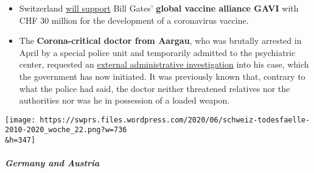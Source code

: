 \begin{itemize}
{  900,000 US dollars} to the Swiss Agency for Therapeutic Products
  \textbf{Swissmedic} for ``projects in Africa''.
\item
  Switzerland
  \href{https://www.aargauerzeitung.ch/panorama/schweiz-unterstuetzt-impfallianz-gavi-mit-30-millionen-138082583}{will
  support} Bill Gates' \textbf{global vaccine alliance GAVI} with CHF 30
  million for the development of a coronavirus vaccine.
\item
  The \textbf{Corona-critical doctor from Aargau}, who was brutally
  arrested in April by a special police unit and temporarily admitted to
  the psychiatric center, requested an
  \href{https://www.aargauerzeitung.ch/aargau/kanton-aargau/polizeieinsatz-wegen-wettinger-arzt-regierung-beschliesst-externe-administrativuntersuchung-137913013}{external
  administrative investigation} into his case, which the government has
  now initiated. It was previously known that, contrary to what the
  police had said, the doctor neither threatened relatives nor the
  authorities nor was he in possession of a loaded weapon.
\end{itemize}

\texttt{[image: https://swprs.files.wordpress.com/2020/06/schweiz-todesfaelle-2010-2020\_woche\_22.png?w=736\\\&h=347]}

\hypertarget{germany-and-austria}{%
\subparagraph{\texorpdfstring{\textbf{Germany and
Austria}}{Germany and Austria}}\label{germany-and-austria}}

